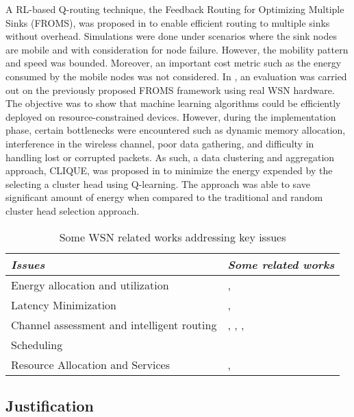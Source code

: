 \documentclass[journal]{IEEEtran}
\begin{document}
A RL-based Q-routing technique, the Feedback Routing for Optimizing Multiple Sinks (FROMS), was proposed in \cite{Forster2007, Forster2007FROMS} to enable efficient routing to multiple sinks without overhead. Simulations were done under scenarios where the sink nodes are mobile and with consideration for node failure. However, the mobility pattern and speed was bounded. Moreover, an important cost metric such as the energy consumed by the mobile nodes was not considered. In \cite{Forster2008}, an evaluation was carried out on the previously proposed FROMS framework using real WSN hardware. The objective was to show that machine learning algorithms could be efficiently deployed on resource-constrained devices. However, during the implementation phase, certain bottlenecks were encountered such as dynamic memory allocation, interference in the wireless channel, poor data gathering, and difficulty in handling lost or corrupted packets. As such, a data clustering and aggregation approach, CLIQUE, was proposed in \cite{Forster2009} to minimize the energy expended by the selecting a cluster head using Q-learning. The approach was able to save significant amount of energy when compared to the traditional and random cluster head selection approach.





\begin{table}
\small
\centering
\caption{Some WSN related works addressing key issues}
\label{table:refissuesWSN}
\begin{tabular}{ll}
  \hline
 \textit{Issues} & \textit{Some related works} \\
  \hline \hline
   Energy allocation and utilization &  \cite{Chen2008}, \cite{Chen2011} \\
   Latency Minimization &  \cite{Liang2009}, \cite{Chen2009}    \\
   Channel assessment and intelligent routing  &  \cite{Forster2007}, \cite{Forster2007FROMS}, \cite{Forster2008}, \cite{Forster2009}\\
   Scheduling &  \cite{Mihaylov}    \\
   Resource Allocation and Services & \cite{Shah2007}, \cite{Shah2013}\\

      \hline \hline
 \end{tabular}
 \end{table}

\subsection{Justification}
\end{document}
